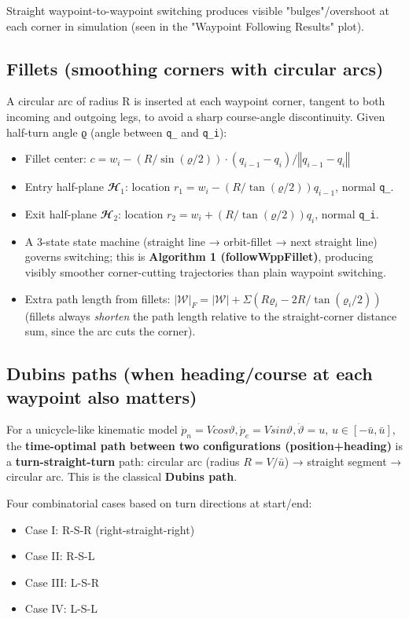 \documentclass[11pt]{article}
\begin{document}
Straight waypoint-to-waypoint switching produces visible "bulges"/overshoot at each corner in simulation (seen in the "Waypoint Following Results" plot).

\subsection{Fillets (smoothing corners with circular arcs)}
A circular arc of radius R is inserted at each waypoint corner, tangent to both incoming and outgoing legs, to avoid a sharp course-angle discontinuity. Given half-turn angle ϱ (angle between \texttt{q\_} and \texttt{q\_\allowbreak{}i}):
\begin{itemize}
\item Fillet center: $c = w_i - (R/\sin(ϱ/2)) · (q_{i-1}-q_i)/‖q_{i-1}-q_i‖$
\item Entry half-plane $𝓗_1$: location $r_1 = w_i - (R/\tan(ϱ/2))q_{i-1}$, normal \texttt{q\_}.
\item Exit half-plane $𝓗_2$: location $r_2 = w_i + (R/\tan(ϱ/2))q_i$, normal \texttt{q\_\allowbreak{}i}.
\item A 3-state state machine (straight line → orbit-fillet → next straight line) governs switching; this is \textbf{Algorithm 1 (followWppFillet)}, producing visibly smoother corner-cutting trajectories than plain waypoint switching.
\item Extra path length from fillets: $|𝒲|_F = |𝒲| + Σ(Rϱ_i - 2R/\tan(ϱ_i/2))$ (fillets always \textit{shorten} the path length relative to the straight-corner distance sum, since the arc cuts the corner).
\end{itemize}

\subsection{Dubins paths (when heading/course at each waypoint also matters)}
For a unicycle-like kinematic model $\dot{p}_n=V cosϑ, \dot{p}_e=V sinϑ, \dot{ϑ}=u$, $u∈[-\bar{u},\bar{u}]$, the \textbf{time-optimal path between two configurations (position+heading)} is a \textbf{turn-straight-turn} path: circular arc (radius $R=V/\bar{u}$) → straight segment → circular arc. This is the classical \textbf{Dubins path}.

Four combinatorial cases based on turn directions at start/end:
\begin{itemize}
\item Case I: R-S-R (right-straight-right)
\item Case II: R-S-L
\item Case III: L-S-R
\item Case IV: L-S-L
\end{itemize}
\end{document}
